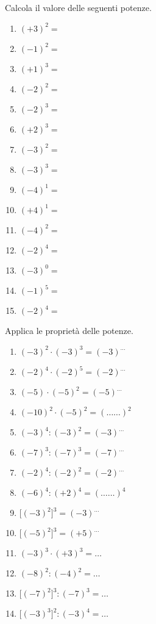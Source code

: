 \begin{esercizio}
\label{ese:2.22}
Calcola il valore delle seguenti potenze.
\begin{multicols}{3}
 \begin{enumerate}[noitemsep, label=(\alph*)]
 \item \((+3)^2 =\)
 \item \((-1)^2 =\)
 \item \((+1)^3 =\)
 \item \((-2)^2 =\)
 \item \((-2)^3 =\)
 \item \((+2)^3 =\)
 \item \((-3)^2 =\)
 \item \((-3)^3 =\)
 \item \((-4)^1 =\)
 \item \((+4)^1 =\)
 \item \((-4)^2 =\)
 \item \((-2)^4 =\)
 \item \((-3)^0 =\)
 \item \((-1)^5 =\)
 \item \((-2)^4 =\)
 \end{enumerate}
 \end{multicols}
\end{esercizio}

\begin{esercizio}
\label{ese:2.23}
 Applica le proprietà delle potenze.
\begin{multicols}{2}
 \begin{enumerate}[noitemsep, label=(\alph*)]
 \item \((-3)^2\cdot(-3)^3 = (-3)^{\ldots}\)
 \item \((-2)^4\cdot(-2)^5 = (-2)^{\ldots}\)
 \item \((-5)\cdot(-5)^2 = (-5)^{\ldots}\)
 \item \((-10)^2\cdot(-5)^2 = (\ldots \ldots)^2\)
 \item \((-3)^4:(-3)^2 = (-3)^{\ldots}\)
 \item \((-7)^3:(-7)^3=(-7)^{\ldots}\)
 \item \((-2)^4:(-2)^2=(-2)^{\ldots}\)
 \item \((-6)^4:(+2)^4=(\ldots \ldots)^4\)
 \item \(\big[(-3)^2\big]^3 = (-3)^{\ldots}\)
 \item \(\big[(-5)^2\big]^3=(+5)^{\ldots}\)
 \item \((-3)^3\cdot(+3)^3 = \ldots\)
 \item \((-8)^2:(-4)^2= \ldots\)
 \item \(\big[(-7)^2\big]^3: (-7)^3 =\ldots\)
 \item \(\big[(-3)^3\big]^2: (-3)^4=\ldots\)
 \end{enumerate}
 \end{multicols}
\end{esercizio}


